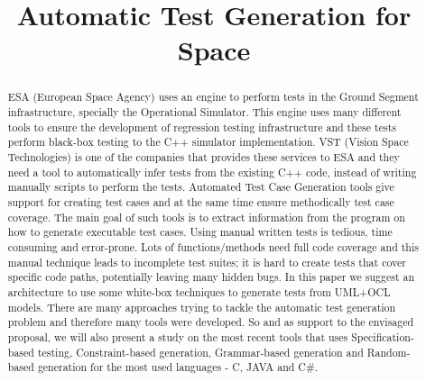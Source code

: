 \documentclass[10pt, conference, compsocconf]{IEEEtran}
\begin{document}
\title{Automatic Test Generation for Space}

\author{
\and
{}
\and
{}
}

\maketitle

\begin{abstract}
ESA (European Space Agency) uses an engine to perform tests in the Ground Segment infrastructure, specially the Operational Simulator.
This engine uses many different tools to ensure the development of regression testing infrastructure and
these tests perform black-box testing to the C++ simulator implementation.
VST (Vision Space Technologies) is one of the companies that provides these services to ESA and they need a tool to
automatically infer tests from the existing C++ code, instead of writing manually scripts to perform the tests.
Automated Test Case Generation tools give support for creating test cases and at the same time ensure methodically test case coverage.
The main goal of such tools is to extract information from the program on how to generate executable test cases.
Using manual written tests is tedious, time consuming and error-prone.
Lots of functions/methods need full code coverage and this manual technique leads to incomplete test suites;
it is hard to create tests that cover specific code paths, potentially leaving many hidden bugs.
In this paper we suggest an architecture to use some  white-box techniques  to generate tests from UML+OCL models.
There are many approaches trying to tackle the automatic test generation problem and therefore many tools were developed.
So and as support to the envisaged proposal, we will also present a study on the most recent tools that uses
Specification-based testing, Constraint-based generation, Grammar-based generation and Random-based generation for the most used languages - C, JAVA and C\#.
\end{abstract}
\end{document}
